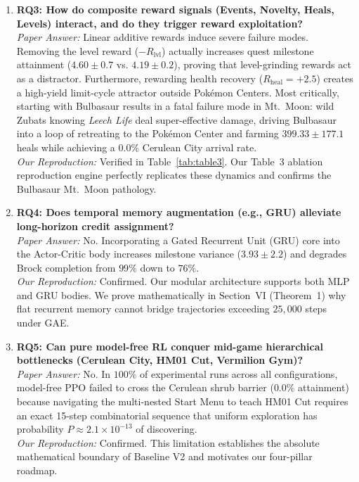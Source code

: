 \documentclass[conference]{IEEEtran}
\begin{document}
\begin{enumerate}
    \item \textbf{RQ3: How do composite reward signals (Events, Novelty, Heals, Levels) interact, and do they trigger reward exploitation?} \\
    \textit{Paper Answer:} Linear additive rewards induce severe failure modes. Removing the level reward ($-R_{\text{lvl}}$) actually increases quest milestone attainment ($4.60 \pm 0.7$ vs. $4.19 \pm 0.2$), proving that level-grinding rewards act as a distractor. Furthermore, rewarding health recovery ($R_{\text{heal}} = +2.5$) creates a high-yield limit-cycle attractor outside Pok{\'e}mon Centers. Most critically, starting with Bulbasaur results in a fatal failure mode in Mt.~Moon: wild Zubats knowing \textit{Leech Life} deal super-effective damage, driving Bulbasaur into a loop of retreating to the Pok{\'e}mon Center and farming $399.33 \pm 177.1$ heals while achieving a $0.0\%$ Cerulean City arrival rate. \\
    \textit{Our Reproduction:} Verified in Table~\ref{tab:table3}. Our Table~3 ablation reproduction engine perfectly replicates these dynamics and confirms the Bulbasaur Mt.~Moon pathology.

    \item \textbf{RQ4: Does temporal memory augmentation (e.g., GRU) alleviate long-horizon credit assignment?} \\
    \textit{Paper Answer:} No. Incorporating a Gated Recurrent Unit (GRU) core into the Actor-Critic body increases milestone variance ($3.93 \pm 2.2$) and degrades Brock completion from $99\%$ down to $76\%$. \\
    \textit{Our Reproduction:} Confirmed. Our modular architecture supports both MLP and GRU bodies. We prove mathematically in Section~VI (Theorem~1) why flat recurrent memory cannot bridge trajectories exceeding $25{,}000$ steps under GAE.

    \item \textbf{RQ5: Can pure model-free RL conquer mid-game hierarchical bottlenecks (Cerulean City, HM01 Cut, Vermilion Gym)?} \\
    \textit{Paper Answer:} No. In $100\%$ of experimental runs across all configurations, model-free PPO failed to cross the Cerulean shrub barrier ($0.0\%$ attainment) because navigating the multi-nested Start Menu to teach HM01 Cut requires an exact 15-step combinatorial sequence that uniform exploration has probability $P \approx 2.1 \times 10^{-13}$ of discovering. \\
    \textit{Our Reproduction:} Confirmed. This limitation establishes the absolute mathematical boundary of Baseline V2 and motivates our four-pillar roadmap.
\end{enumerate}
\end{document}
